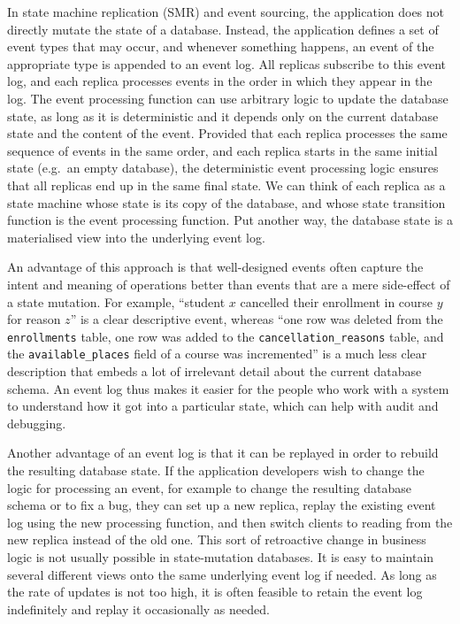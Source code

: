 \documentclass[sigconf,nonacm]{acmart}
\begin{document}
In state machine replication (SMR) and event sourcing, the application does not directly mutate the state of a database.
Instead, the application defines a set of event types that may occur, and whenever something happens, an event of the appropriate type is appended to an event log.
All replicas subscribe to this event log, and each replica processes events in the order in which they appear in the log.
The event processing function can use arbitrary logic to update the database state, as long as it is deterministic and it depends only on the current database state and the content of the event.
Provided that each replica processes the same sequence of events in the same order, and each replica starts in the same initial state (e.g.\ an empty database), the deterministic event processing logic ensures that all replicas end up in the same final state.
We can think of each replica as a state machine whose state is its copy of the database, and whose state transition function is the event processing function.
Put another way, the database state is a materialised view into the underlying event log.

An advantage of this approach is that well-designed events often capture the intent and meaning of operations better than events that are a mere side-effect of a state mutation.
For example, ``student $x$ cancelled their enrollment in course $y$ for reason $z$'' is a clear descriptive event, whereas ``one row was deleted from the \verb+enrollments+ table, one row was added to the \verb+cancellation_reasons+ table, and the \verb+available_places+ field of a course was incremented'' is a much less clear description that embeds a lot of irrelevant detail about the current database schema.
An event log thus makes it easier for the people who work with a system to understand how it got into a particular state, which can help with audit and debugging.

Another advantage of an event log is that it can be replayed in order to rebuild the resulting database state.
If the application developers wish to change the logic for processing an event, for example to change the resulting database schema or to fix a bug, they can set up a new replica, replay the existing event log using the new processing function, and then switch clients to reading from the new replica instead of the old one.
This sort of retroactive change in business logic is not usually possible in state-mutation databases.
It is easy to maintain several different views onto the same underlying event log if needed.
As long as the rate of updates is not too high, it is often feasible to retain the event log indefinitely and replay it occasionally as needed.
\end{document}

